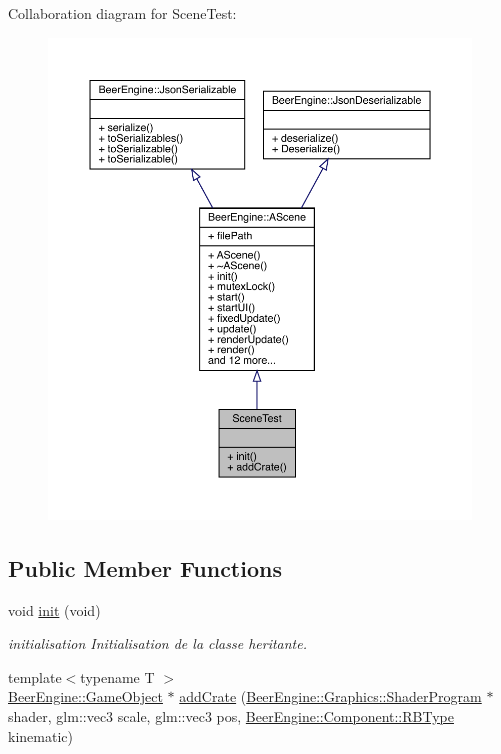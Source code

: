 Collaboration diagram for Scene\+Test\+:
\nopagebreak
\begin{figure}[H]
\begin{center}
\leavevmode
\includegraphics[width=350pt]{class_scene_test__coll__graph}
\end{center}
\end{figure}
\subsection*{Public Member Functions}
\begin{DoxyCompactItemize}
\item 
void \mbox{\hyperlink{class_scene_test_aedded03410798c3705fb3fb028e56ab5}{init}} (void)
\begin{DoxyCompactList}\small\item\em initialisation Initialisation de la classe heritante. \end{DoxyCompactList}\item 
{\footnotesize template$<$typename T $>$ }\\\mbox{\hyperlink{class_beer_engine_1_1_game_object}{Beer\+Engine\+::\+Game\+Object}} $\ast$ \mbox{\hyperlink{class_scene_test_a29d4ffbd6a5035a4d62e9e59b311f791}{add\+Crate}} (\mbox{\hyperlink{class_beer_engine_1_1_graphics_1_1_shader_program}{Beer\+Engine\+::\+Graphics\+::\+Shader\+Program}} $\ast$shader, glm\+::vec3 scale, glm\+::vec3 pos, \mbox{\hyperlink{namespace_beer_engine_1_1_component_a2cfe279cc309b6420e792597940b8a33}{Beer\+Engine\+::\+Component\+::\+R\+B\+Type}} kinematic)
\end{DoxyCompactItemize}
